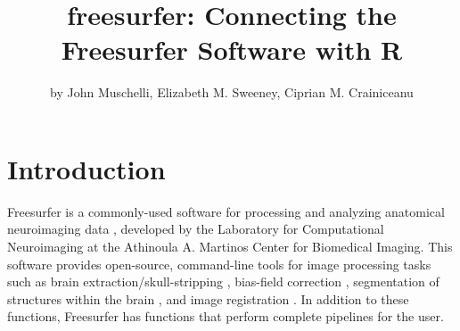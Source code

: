 \title{freesurfer: Connecting the Freesurfer Software with R}
\author{by John Muschelli, Elizabeth M. Sweeney, Ciprian M. Crainiceanu}

\maketitle


\section{Introduction}\label{introduction}

\label{sec:intro}

Freesurfer is a commonly-used software for processing and analyzing
anatomical neuroimaging data \citep{fischl2012freesurfer}, developed by
the Laboratory for Computational Neuroimaging at the Athinoula A.
Martinos Center for Biomedical Imaging. This software provides
open-source, command-line tools for image processing tasks such as brain
extraction/skull-stripping \citep{segonne2004hybrid}, bias-field
correction \citep{sled_nonparametric_1998}, segmentation of structures
within the brain \citep{fischl2002whole,fischl2004sequence}, and image
registration \citep{fischl1999high,reuter2010highly}. In addition to
these functions, Freesurfer has functions that perform complete
pipelines for the user.

